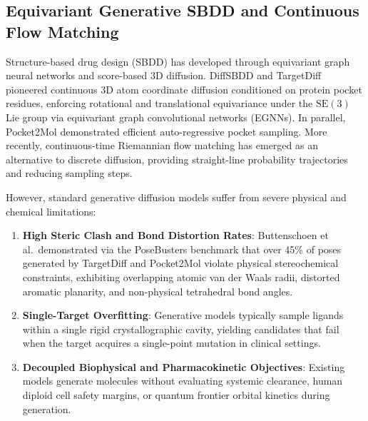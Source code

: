 \subsection{Equivariant Generative SBDD and Continuous Flow Matching}
Structure-based drug design (SBDD) has developed through equivariant graph neural networks and score-based 3D diffusion. DiffSBDD \cite{schneuing2022diffsbdd} and TargetDiff \cite{guan2023targetdiff} pioneered continuous 3D atom coordinate diffusion conditioned on protein pocket residues, enforcing rotational and translational equivariance under the $\mathrm{SE}(3)$ Lie group via equivariant graph convolutional networks (EGNNs). In parallel, Pocket2Mol \cite{peng2022pocket2mol} demonstrated efficient auto-regressive pocket sampling. More recently, continuous-time Riemannian flow matching \cite{lipman2023flow,albergo2023building} has emerged as an alternative to discrete diffusion, providing straight-line probability trajectories and reducing sampling steps.

However, standard generative diffusion models suffer from severe physical and chemical limitations:
\begin{enumerate}
    \item \textbf{High Steric Clash and Bond Distortion Rates}: Buttenschoen et al.\ demonstrated via the PoseBusters benchmark \cite{van2023posebusters} that over 45\% of poses generated by TargetDiff and Pocket2Mol violate physical stereochemical constraints, exhibiting overlapping atomic van der Waals radii, distorted aromatic planarity, and non-physical tetrahedral bond angles.
    \item \textbf{Single-Target Overfitting}: Generative models typically sample ligands within a single rigid crystallographic cavity, yielding candidates that fail when the target acquires a single-point mutation in clinical settings.
    \item \textbf{Decoupled Biophysical and Pharmacokinetic Objectives}: Existing models generate molecules without evaluating systemic clearance, human diploid cell safety margins, or quantum frontier orbital kinetics during generation.
\end{enumerate}

